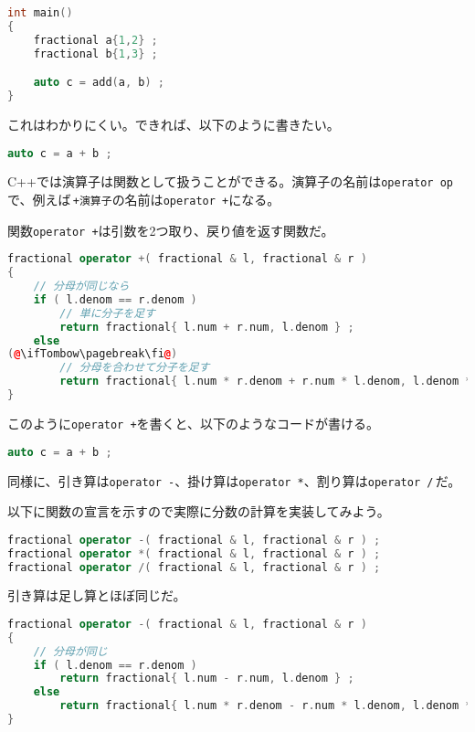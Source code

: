\begin{lstlisting}[language={C++}]
int main()
{
    fractional a{1,2} ;
    fractional b{1,3} ;

    auto c = add(a, b) ;
}
\end{lstlisting}

これはわかりにくい。できれば、以下のように書きたい。

\begin{lstlisting}[language={C++}]
auto c = a + b ;
\end{lstlisting}

C++では演算子は関数として扱うことができる。演算子の名前は\texttt{operator op}で、例えば\,\texttt{+演算子}の名前は\texttt{operator +}になる。

関数\texttt{operator +}は引数を2つ取り、戻り値を返す関数だ。

\begin{lstlisting}[language={C++}]
fractional operator +( fractional & l, fractional & r )
{
    // 分母が同じなら
    if ( l.denom == r.denom )
        // 単に分子を足す
        return fractional{ l.num + r.num, l.denom } ;
    else
(@\ifTombow\pagebreak\fi@)
        // 分母を合わせて分子を足す
        return fractional{ l.num * r.denom + r.num * l.denom, l.denom * r.denom } ;
}
\end{lstlisting}

このように\texttt{operator +}を書くと、以下のようなコードが書ける。

\begin{lstlisting}[language={C++}]
auto c = a + b ;
\end{lstlisting}

同様に、引き算は\texttt{operator -}、掛け算は\texttt{operator *}、割り算は\texttt{operator /}\,だ。

以下に関数の宣言を示すので実際に分数の計算を実装してみよう。

\begin{lstlisting}[language={C++}]
fractional operator -( fractional & l, fractional & r ) ;
fractional operator *( fractional & l, fractional & r ) ;
fractional operator /( fractional & l, fractional & r ) ;
\end{lstlisting}

引き算は足し算とほぼ同じだ。

\begin{lstlisting}[language={C++}]
fractional operator -( fractional & l, fractional & r )
{
    // 分母が同じ
    if ( l.denom == r.denom )
        return fractional{ l.num - r.num, l.denom } ;
    else
        return fractional{ l.num * r.denom - r.num * l.denom, l.denom * r.denom } ;
}
\end{lstlisting}

